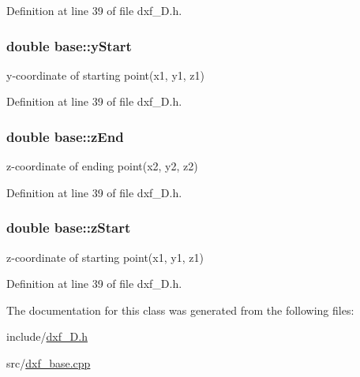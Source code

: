 Definition at line 39 of file dxf\-\_\-D.\-h.

\hypertarget{classbase_a11d50718a751a277f133430692b13bbf}{
\subsubsection[{y\-Start}]{\setlength{\rightskip}{0pt plus 5cm}double base\-::y\-Start\hspace{0.3cm}{\ttfamily [protected]}}}\label{classbase_a11d50718a751a277f133430692b13bbf}
y-\/coordinate of starting point(x1, y1, z1) 

Definition at line 39 of file dxf\-\_\-D.\-h.

\hypertarget{classbase_ad599903bf17e619b3fe11c592f981682}{
\subsubsection[{z\-End}]{\setlength{\rightskip}{0pt plus 5cm}double base\-::z\-End\hspace{0.3cm}{\ttfamily [protected]}}}\label{classbase_ad599903bf17e619b3fe11c592f981682}
z-\/coordinate of ending point(x2, y2, z2) 

Definition at line 39 of file dxf\-\_\-D.\-h.

\hypertarget{classbase_aa53533269b638644cb48a1cafc969852}{
\subsubsection[{z\-Start}]{\setlength{\rightskip}{0pt plus 5cm}double base\-::z\-Start\hspace{0.3cm}{\ttfamily [protected]}}}\label{classbase_aa53533269b638644cb48a1cafc969852}
z-\/coordinate of starting point(x1, y1, z1) 

Definition at line 39 of file dxf\-\_\-D.\-h.



The documentation for this class was generated from the following files\-:\begin{DoxyCompactItemize}
\item 
include/\hyperlink{dxf__2D_8h}{dxf\-\_\-D.\-h}\item 
src/\hyperlink{dxf__base_8cpp}{dxf\-\_\-base.\-cpp}\end{DoxyCompactItemize}
